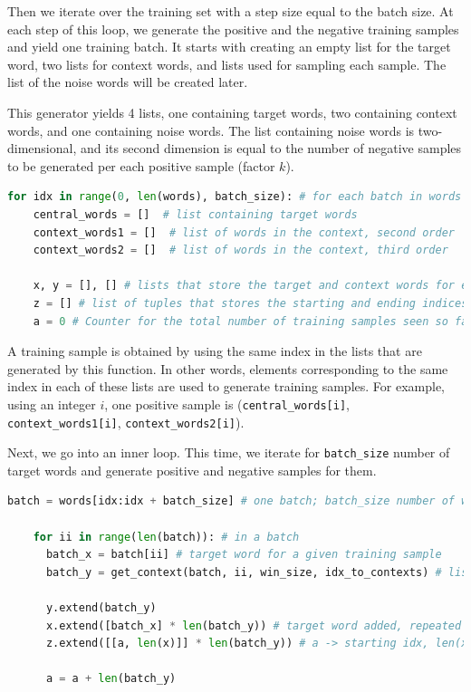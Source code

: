 Then we iterate over the training set with a step size equal to the batch size. At each step of this loop, we generate the positive and the negative training samples and yield one training batch. It starts with creating an empty list for the target word, two lists for context words, and lists used for sampling each sample. The list of the noise words will be created later. 

This generator yields 4 lists, one containing target words, two containing context words, and one containing noise words. The list containing noise words is two-dimensional, and its second dimension is equal to the number of negative samples to be generated per each positive sample (factor $k$).

\begin{lstlisting}[language=Python, caption=Batch generating function - Part 2]
  for idx in range(0, len(words), batch_size): # for each batch in words
    central_words = []  # list containing target words
    context_words1 = []  # list of words in the context, second order
    context_words2 = []  # list of words in the context, third order

    x, y = [], [] # lists that store the target and context words for each training sample
    z = [] # list of tuples that stores the starting and ending indices of each training sample in the x and y lists
    a = 0 # Counter for the total number of training samples seen so far. Used to keep track of the indices in z.
\end{lstlisting}

A training sample is obtained by using the same index in the lists that are generated by this function. In other words, elements corresponding to the same index in each of these lists are used to generate training samples. For example, using an integer $i$, one positive sample is (\verb|central_words[i]|, \verb|context_words1[i]|, \verb|context_words2[i]|). %

Next, we go into an inner loop. This time, we iterate for \verb|batch_size| number of target words and generate positive and negative samples for them.

\begin{lstlisting}[language=Python, caption=Batch generating function - Part 3]
    batch = words[idx:idx + batch_size] # one batch; batch_size number of words (unique), starting from index idx

    for ii in range(len(batch)): # in a batch
      batch_x = batch[ii] # target word for a given training sample
      batch_y = get_context(batch, ii, win_size, idx_to_contexts) # list of context words for that target word

      y.extend(batch_y)
      x.extend([batch_x] * len(batch_y)) # target word added, repeated by the number of context words
      z.extend([[a, len(x)]] * len(batch_y)) # a -> starting idx, len(x) -> end index (for one training sample)

      a = a + len(batch_y)
\end{lstlisting}

